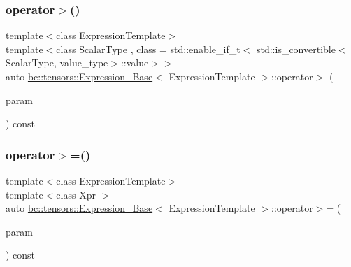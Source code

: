 \subsubsection{\texorpdfstring{operator$>$()}{operator>()}\hspace{0.1cm}{\footnotesize\ttfamily [2/2]}}
{\footnotesize\ttfamily template$<$class Expression\+Template$>$ \\
template$<$class Scalar\+Type , class  = std\+::enable\+\_\+if\+\_\+t$<$   std\+::is\+\_\+convertible$<$\+Scalar\+Type, value\+\_\+type$>$\+::value$>$$>$ \\
auto \hyperlink{classbc_1_1tensors_1_1Expression__Base}{bc\+::tensors\+::\+Expression\+\_\+\+Base}$<$ Expression\+Template $>$\+::operator$>$ (\begin{DoxyParamCaption}\item[{const Scalar\+Type \&}]{param }\end{DoxyParamCaption}) const\hspace{0.3cm}{\ttfamily [inline]}}

\mbox{\label{classbc_1_1tensors_1_1Expression__Base_a1a503a1127bc1cbaa98e7310dd1475e9}} 
\subsubsection{\texorpdfstring{operator$>$=()}{operator>=()}\hspace{0.1cm}{\footnotesize\ttfamily [1/2]}}
{\footnotesize\ttfamily template$<$class Expression\+Template$>$ \\
template$<$class Xpr $>$ \\
auto \hyperlink{classbc_1_1tensors_1_1Expression__Base}{bc\+::tensors\+::\+Expression\+\_\+\+Base}$<$ Expression\+Template $>$\+::operator$>$= (\begin{DoxyParamCaption}\item[{const \hyperlink{classbc_1_1tensors_1_1Expression__Base}{Expression\+\_\+\+Base}$<$ Xpr $>$ \&}]{param }\end{DoxyParamCaption}) const\hspace{0.3cm}{\ttfamily [inline]}}

\mbox{\label{classbc_1_1tensors_1_1Expression__Base_a1959fe63f787e816c691c770675ba8c5}} 
